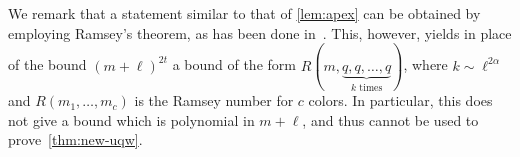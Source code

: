 We remark that a statement similar to that of \cref{lem:apex}
can be obtained by employing Ramsey's theorem, as has been done in~\cite{nevsetvril2011nowhere}. This, however, yields
in place of the bound $(m+\ell)^{2t}$ a bound of the form $R(m,\underbrace{q,q,\ldots,q}_{k\text{ times}})$,
where $k\sim\ell^{2\alpha}$ and $R(m_1,\ldots,m_c)$
is the Ramsey number for $c$ colors.
In particular, this does not give a bound which is polynomial in $m+\ell$, and thus cannot be used to prove~\cref{thm:new-uqw}.

%
%
%
%
%
